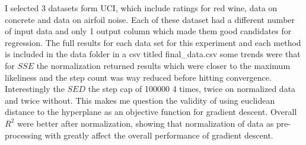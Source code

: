 \documentclass[a4 paper]{article}
\begin{document}
\begin{enumerate}
I selected 3 datasets form UCI, which include ratings for red wine, data on concrete and data on airfoil noise. Each of these dataset had a different number of input data and only 1 output column which made them good candidates for regression. The full results for each data set for this experiment  and each method is included in the data folder in a csv titled final\_data.csv
some trends were that for $SSE$ the normalization returned results which were closer to the maximum likeliness and the step count was way reduced before hitting convergence. Interestingly the $SED$ the step cap of 100000 4 times, twice on normalized data and twice without. This makes me question the validity of using euclidean distance to the hyperplane as an objective function for gradient descent.  Overall $R^2$ were better after normalization, showing that normalization of data as pre-processing with greatly affect the overall performance of gradient descent. 
	 
	\end{enumerate}
\end{document}
